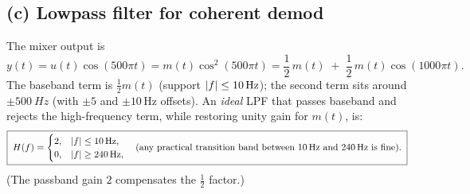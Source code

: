 \documentclass[11pt]{article}
\begin{document}
\subsection*{(c) Lowpass filter for coherent demod}
The mixer output is
\[
y(t)=u(t)\cos(500\pi t)=m(t)\cos^2(500\pi t)=\frac{1}{2}\,m(t)\;+\;\frac{1}{2}\,m(t)\cos(1000\pi t).
\]
The baseband term is $\frac{1}{2}m(t)$ (support $\abs{f}\le \SI{10}{Hz}$); the second term sits around $\pm \SI{500}{Hz}$ (with $\pm 5$ and $\pm 10$\,Hz offsets). An \emph{ideal} LPF that passes baseband and rejects the high-frequency term, while restoring unity gain for $m(t)$, is:
\[
\boxed{\;
H(f)=
\begin{cases}
2, & |f|\le \SI{10}{Hz},\\
0, & |f|\ge \SI{240}{Hz},
\end{cases}
\quad\text{(any practical transition band between \SI{10}{Hz} and \SI{240}{Hz} is fine).}
\;}
\]
(The passband gain $2$ compensates the $\tfrac{1}{2}$ factor.)
\end{document}
